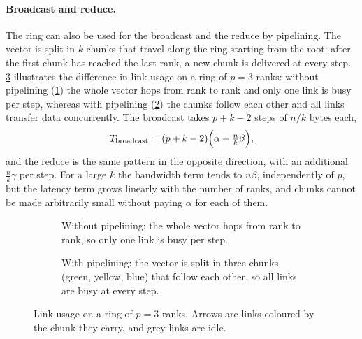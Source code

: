 \paragraph{Broadcast and reduce.}
The ring can also be used for the broadcast and the reduce by pipelining.
The vector is split in $k$ chunks that travel along the ring starting from the root: after the first chunk has reached the last rank, a new chunk is delivered at every step.
\cref{fig:bg-ring-links} illustrates the difference in link usage on a ring of $p=3$ ranks: without pipelining (\cref{fig:bg-ring-nopipe}) the whole vector hops from rank to rank and only one link is busy per step, whereas with pipelining (\cref{fig:bg-ring-pipe}) the chunks follow each other and all links transfer data concurrently.
The broadcast takes $p+k-2$ steps of $n/k$ bytes each,
\begin{equation}
  T_{\text{broadcast}} = (p+k-2)\Bigl(\alpha+\tfrac{n}{k}\beta\Bigr),
  \label{eq:bg-ring-bcast}
\end{equation}
and the reduce is the same pattern in the opposite direction, with an additional $\tfrac{n}{k}\gamma$ per step.
For a large $k$ the bandwidth term tends to $n\beta$, independently of $p$, but the latency term grows linearly with the number of ranks, and chunks cannot be made arbitrarily small without paying $\alpha$ for each of them.

\begin{figure}[H]
  \centering
  \begin{subfigure}[b]{\linewidth}
    \centering
    \hfill
    \hfill
    \caption{Without pipelining: the whole vector hops from rank to rank,
             so only one link is busy per step.}
    \label{fig:bg-ring-nopipe}
  \end{subfigure}

  \vspace{1.5em}

  \begin{subfigure}[b]{\linewidth}
    \centering
    \hfill
    \hfill
    \caption{With pipelining: the vector is split in three chunks (green, yellow,
             blue) that follow each other, so all links are busy at every step.}
    \label{fig:bg-ring-pipe}
  \end{subfigure}
  \caption{Link usage on a ring of $p=3$ ranks. Arrows are links coloured by the
           chunk they carry, and grey links are idle.}
  \label{fig:bg-ring-links}
\end{figure}

